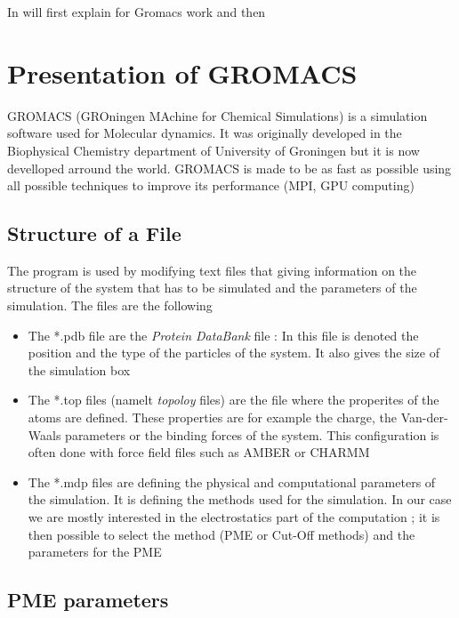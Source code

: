 \documentclass[12pt,twoside,a4paper]{report}
\begin{document}
    In will first explain for Gromacs work and then 


\section{Presentation of GROMACS}

    GROMACS (GROningen MAchine for Chemical Simulations) is a simulation software used for Molecular dynamics. It was originally developed in the Biophysical Chemistry department of University of Groningen but it is now develloped arround the world. GROMACS is made to be as fast as possible using all possible techniques to improve its performance (MPI, GPU computing) 
    
   
	\subsection{Structure of a File}
	
	 The program is used  by modifying text files that giving information on the structure of the system that has to be simulated and the parameters of the simulation. The files are the following 
	 
	\begin{itemize}
	
	\item The *.pdb file are the \textit{Protein DataBank} file : In this file is denoted the position and the type of the particles of the system. It also gives the size of the simulation box

	\item The *.top files (namelt \textit{topoloy} files) are the file where the properites of the atoms are defined. These properties are for example the charge, the Van-der-Waals parameters or the binding forces of the system. This configuration is often done with force field files such as AMBER or CHARMM
		 
	\item The *.mdp files are defining the physical and computational parameters of the simulation. It is defining the methods used for the simulation. In our case we are mostly interested in the electrostatics part of the computation ; it is then possible to select the method (PME or Cut-Off methods) and the parameters for the PME
	
	\end{itemize}
		
	\subsection{PME parameters}
	
\end{document}
